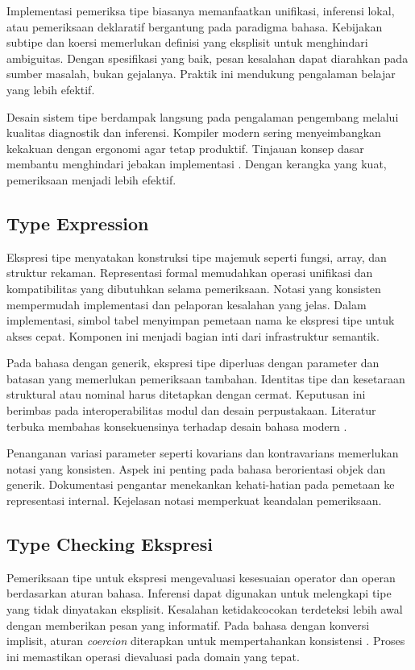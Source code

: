 \documentclass[../main.tex]{subfiles}
\begin{document}
Implementasi pemeriksa tipe biasanya memanfaatkan unifikasi, inferensi lokal, atau pemeriksaan deklaratif bergantung pada paradigma bahasa. Kebijakan subtipe dan koersi memerlukan definisi yang eksplisit untuk menghindari ambiguitas. Dengan spesifikasi yang baik, pesan kesalahan dapat diarahkan pada sumber masalah, bukan gejalanya. Praktik ini mendukung pengalaman belajar yang lebih efektif.

Desain sistem tipe berdampak langsung pada pengalaman pengembang melalui kualitas diagnostik dan inferensi. Kompiler modern sering menyeimbangkan kekakuan dengan ergonomi agar tetap produktif. Tinjauan konsep dasar membantu menghindari jebakan implementasi \citep{WikiTypeSystem}. Dengan kerangka yang kuat, pemeriksaan menjadi lebih efektif.

\subsection{Type Expression}
Ekspresi tipe menyatakan konstruksi tipe majemuk seperti fungsi, array, dan struktur rekaman. Representasi formal memudahkan operasi unifikasi dan kompatibilitas yang dibutuhkan selama pemeriksaan. Notasi yang konsisten mempermudah implementasi dan pelaporan kesalahan yang jelas. Dalam implementasi, simbol tabel menyimpan pemetaan nama ke ekspresi tipe untuk akses cepat. Komponen ini menjadi bagian inti dari infrastruktur semantik.

Pada bahasa dengan generik, ekspresi tipe diperluas dengan parameter dan batasan yang memerlukan pemeriksaan tambahan. Identitas tipe dan kesetaraan struktural atau nominal harus ditetapkan dengan cermat. Keputusan ini berimbas pada interoperabilitas modul dan desain perpustakaan. Literatur terbuka membahas konsekuensinya terhadap desain bahasa modern \citep{WikiTypeSystem}.

Penanganan variasi parameter seperti kovarians dan kontravarians memerlukan notasi yang konsisten. Aspek ini penting pada bahasa berorientasi objek dan generik. Dokumentasi pengantar menekankan kehati-hatian pada pemetaan ke representasi internal. Kejelasan notasi memperkuat keandalan pemeriksaan.

\subsection{Type Checking Ekspresi}
Pemeriksaan tipe untuk ekspresi mengevaluasi kesesuaian operator dan operan berdasarkan aturan bahasa. Inferensi dapat digunakan untuk melengkapi tipe yang tidak dinyatakan eksplisit. Kesalahan ketidakcocokan terdeteksi lebih awal dengan memberikan pesan yang informatif. Pada bahasa dengan konversi implisit, aturan \emph{coercion} diterapkan untuk mempertahankan konsistensi \citep{WikiTypeChecking,WikiCoercion}. Proses ini memastikan operasi dievaluasi pada domain yang tepat.
\end{document}
